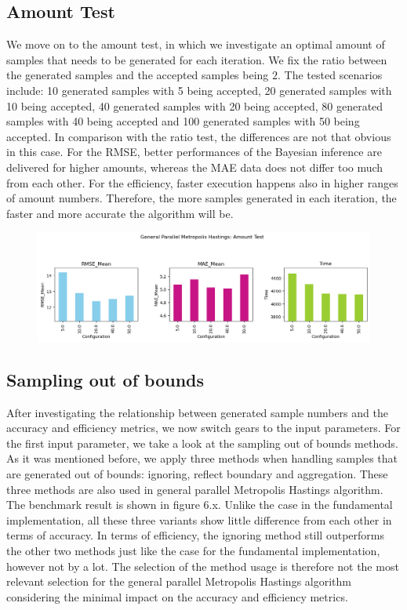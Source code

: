 \subsection{Amount Test}
We move on to the amount test, in which we investigate an optimal amount of samples that needs to be generated for each iteration. We fix the ratio between the generated samples and the accepted samples being $2$. The tested scenarios include: 10 generated samples with 5 being accepted, 20 generated samples with 10 being accepted, 40 generated samples with 20 being accepted, 80 generated samples with 40 being accepted and 100 generated samples with 50 being accepted. In comparison with the ratio test, the differences are not that obvious in this case. For the RMSE, better performances of the Bayesian inference are delivered for higher amounts, whereas the MAE data does not differ too much from each other. For the efficiency, faster execution happens also in higher ranges of amount numbers. Therefore, the more samples generated in each iteration, the faster and more accurate the algorithm will be.

\begin{figure}[H]
    \centering
    \includegraphics[width=1\textwidth]{figures/gpmh/amount_test.png}
    \captionsetup{width=.8\textwidth}
    \caption{}
    \label{fig:enter-label}
\end{figure}

\subsection{Sampling out of bounds}
After investigating the relationship between generated sample numbers and the accuracy and efficiency metrics, we now switch gears to the input parameters. For the first input parameter, we take a look at the sampling out of bounds methods. As it was mentioned before, we apply three methods when handling samples that are generated out of bounds: ignoring, reflect boundary and aggregation. These three methods are also used in general parallel Metropolis Hastings algorithm. The benchmark result is shown in figure 6.x. Unlike the case in the fundamental implementation, all these three variants show little difference from each other in terms of accuracy. In terms of efficiency, the ignoring method still outperforms the other two methods just like the case for the fundamental implementation, however not by a lot. The selection of the method usage is therefore not the most relevant selection for the general parallel Metropolis Hastings algorithm considering the minimal impact on the accuracy and efficiency metrics.


